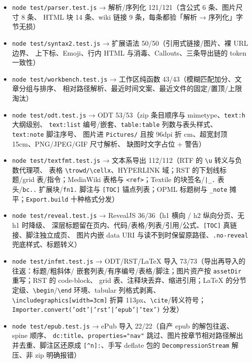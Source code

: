 \documentclass[11pt,a4paper]{ctexart}
\begin{document}
\begin{itemize}
\item \texttt{node test/parser.test.js} → 解析/序列化 121/121（含公式 6 条、图片尺寸 8 条、
HTML 块 14 条、wiki 链接 9 条，每条都验「解析 → 序列化」字节无损）
\item \texttt{node test/syntax2.test.js} → 扩展语法 50/50（引用式链接/图片、裸 URL 边界、
上下标、Emoji、行内 HTML 与消毒、Callouts、三条导出链的 token 一致性）
\item \texttt{node test/workbench.test.js} → 工作区纯函数 43/43（模糊匹配加分、文章分组与排序、
相对路径解析、最近时间文案、最近文件的固定/置顶/上限淘汰）
\item \texttt{node test/odt.test.js} → ODT 53/53（zip 条目顺序与 mimetype、\texttt{text:h} 大纲级别、
\texttt{text:list} 编号/嵌套、\texttt{table:table} 列数与表头样式、\texttt{text:note} 脚注序号、
图片进 \texttt{Pictures/} 且按 96dpi 折 cm、超宽封顶 15cm、PNG/JPEG/GIF 尺寸解析、
缺图时文字占位 + 警告）
\item \texttt{node test/textfmt.test.js} → 文本系导出 112/112（RTF 的 \texttt{\textbackslash{}u} 转义与负数代理项、
表格 \texttt{\textbackslash{}trowd/\textbackslash{}cellx}、HYPERLINK 域；RST 的下划线标题/grid 表/指令；MediaWiki
表格与 \texttt{\textless{}ref\textgreater{}}；Textile 的块签名/\texttt{|\_.} 表头/\texttt{bc..} 扩展块/\texttt{fn1.} 脚注与 \texttt{[TOC]}
锚点列表；OPML 标题树与 \texttt{\_note} 摊平；\texttt{Export.build} 十种格式分发）
\item \texttt{node test/reveal.test.js} → RevealJS 36/36（h1 横向 / h2 纵向分页、无 h1 时降级、
深层标题留在页内、代码/表格/列表/引用/公式、\texttt{[TOC]} 真链接、脚注独立成页、
图片内嵌 data URI 与读不到时保留原路径、\texttt{.no-reveal} 兜底样式、标题转义）
\item \texttt{node test/infmt.test.js} → ODT/RST/LaTeX 导入 73/73（导出再导入的往返：标题/粗斜体/
嵌套列表/有序编号/表格/脚注；图片资产按 \texttt{assetDir} 重写；RST 的 code-block、
grid 表、注释块丢弃、缩进引用；LaTeX 的分节定级、\texttt{\textbackslash{}begin}/\texttt{\textbackslash{}end} 环境、tabular
列格式剥离、\texttt{\textbackslash{}includegraphics[width=3cm]} 折算 113px、\texttt{\textbackslash{}cite}/转义符号；
\texttt{Importer.convert('odt'|'rst'|'epub'|'tex')} 分发）
\item \texttt{node test/epub.test.js} → ePub 导入 22/22（自产 epub 的解包往返、spine 顺序、
\texttt{dc:title}、\texttt{properties="nav"} 跳过、图片按章节相对路径解出并去重、脚注区还原成
\texttt{[\textasciicircum{}n]:}、手写 deflate 包的 \texttt{DecompressionStream} 解压、非 zip 明确报错）

\end{itemize}
\end{document}
